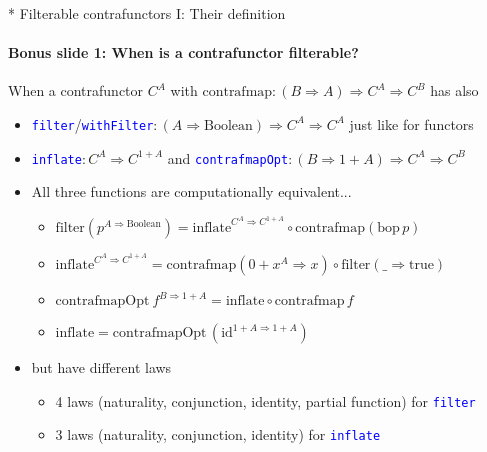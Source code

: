 \documentclass[english]{beamer}
\begin{document}
\begin{frame}{{*} Filterable contrafunctors I: Their definition}

\framesubtitle{Bonus slide 1: When is a contrafunctor filterable?}

When a contrafunctor $C^{A}$ with {\footnotesize{}$\text{contrafmap}:\left(B\Rightarrow A\right)\Rightarrow C^{A}\Rightarrow C^{B}$}
has also
\begin{itemize}
\item \texttt{\textcolor{blue}{\footnotesize{}filter}}/\texttt{\textcolor{blue}{\footnotesize{}withFilter}}{\footnotesize{}$:\left(A\Rightarrow\text{Boolean}\right)\Rightarrow C^{A}\Rightarrow C^{A}$}
just like for functors
\item \texttt{\textcolor{blue}{\footnotesize{}inflate}}{\footnotesize{}$:C^{A}\Rightarrow C^{1+A}$}
and \texttt{\textcolor{blue}{\footnotesize{}contrafmapOpt}}{\footnotesize{}$:\left(B\Rightarrow1+A\right)\Rightarrow C^{A}\Rightarrow C^{B}$}{\footnotesize \par}
\item All three functions are computationally equivalent...
\begin{itemize}
\item {\footnotesize{}$\text{filter}(p^{A\Rightarrow\text{Boolean}})=\text{inflate}^{C^{A}\Rightarrow C^{1+A}}\circ\text{contrafmap}(\text{bop}\,p)$}{\footnotesize \par}
\item {\footnotesize{}$\text{inflate}^{C^{A}\Rightarrow C^{1+A}}=\text{contrafmap}\left(0+x^{A}\Rightarrow x\right)\circ\text{filter}\left(\_\Rightarrow\text{true}\right)$}{\footnotesize \par}
\item {\footnotesize{}$\text{contrafmapOpt}\:f^{B\Rightarrow1+A}=\text{inflate}\circ\text{contrafmap}\,f$}{\footnotesize \par}
\item {\footnotesize{}$\text{inflate}=\text{contrafmapOpt}\,(\text{id}^{1+A\Rightarrow1+A})$}{\footnotesize \par}
\end{itemize}
\item but have different laws
\begin{itemize}
\item 4 laws (naturality, conjunction, identity, partial function) for \texttt{\textcolor{blue}{\footnotesize{}filter}} 
\item 3 laws (naturality, conjunction, identity) for \texttt{\textcolor{blue}{\footnotesize{}inflate}} 

\end{itemize}
\end{itemize}
\end{frame}
\end{document}
